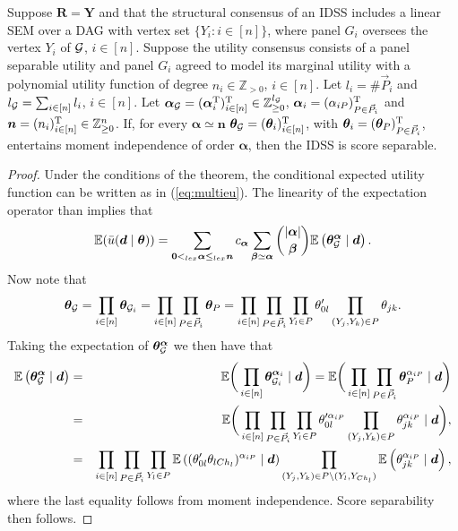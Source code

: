 \begin{theorem}
Suppose $\bm{R}=\bm{Y}$ and that the structural consensus of an IDSS includes a linear SEM over a DAG with vertex set $\{Y_i:i\in[n]\}$, where panel $G_i$ oversees the vertex $Y_i$ of $\mathcal{G}$, $i\in[n]$. Suppose the utility consensus consists of a panel separable  utility and panel $G_i$ agreed to model its marginal utility with a polynomial utility function of degree $n_i\in\mathbb{Z}_{>0}$, $i\in[n]$. Let $l_i=\#\vec{P}_i$ and $l_{\mathcal{G}}=\sum_{i\in[n]}l_i$, $i\in[n]$. Let $\bm{\alpha}_{\mathcal{G}}=(\bm{\alpha}_i^{\textnormal{T}})^{\textnormal{T}}_{i\in[n]}\in\mathbb{Z}^{l_{\mathcal{G}}}_{\geq 0}$, $\bm{\alpha}_i=(\alpha_{iP})^{\textnormal{T}}_{P\in\vec{P}_i}$ and $\bm{n}=(n_i)_{i\in[n]}^{\textnormal{T}}\in\mathbb{Z}^{n}_{\geq 0}$. If, for every $\bm{\alpha}\simeq \bm{n}$  $\bm{\theta}_{\mathcal{G}}=(\bm{\theta}_i)_{i\in[n]}^{\textnormal{T}}$, with $\bm{\theta}_i=(\bm{\theta}_{P})^{\textnormal{T}}_{P\in\vec{P}_i}$, entertains moment independence of order $\bm{\alpha}$, then the IDSS is score separable.  
\end{theorem}
 \begin{proof}
Under the conditions of the theorem, the conditional expected utility function can be written as in (\ref{eq:multieu}). The linearity of the expectation operator than implies that
\[
\mathbb{E}(\bar{u}(\bm{d}\;|\;\bm{\theta}))=\sum_{\bm{0}<_{lex}\bm{\alpha}\leq_{lex}\bm{n}}c_{\bm{\alpha}}\sum_{\bm{\beta}\simeq \bm{\alpha}}\binom{|\bm{\alpha}|}{\bm{\beta}}\mathbb{E}\left(\bm{\theta}_{\mathcal{G}}^{\bm{\alpha}}\;|\;\bm{d}\right).
\]
Now note that 
\[
\bm{\theta}_{\mathcal{G}}=\prod_{i\in[n]}\bm{\theta}_{\mathcal{G}_i}=\prod_{i\in[n]}\prod_{P\in\vec{P}_i}\bm{\theta}_P=\prod_{i\in[n]}\prod_{P\in\vec{P}_i}\prod_{Y_l\in P}\theta_{0l}'\prod_{(Y_j,Y_k)\in P}\theta_{jk}.
\]
Taking the expectation of $\bm{\theta}_{\mathcal{G}}^{\bm{\alpha}}$ we then have that 
\begin{eqnarray*}
\mathbb{E}\left(\bm{\theta}_{\mathcal{G}}^{\bm{\alpha}}\;|\;\bm{d}\right)&=& \mathbb{E}\bigg(\prod_{i\in[n]}\bm{\theta}_{\mathcal{G}_i}^{\bm{\alpha}_i}\;|\;\bm{d}\bigg)=\mathbb{E}\bigg(\prod_{i\in[n]}\prod_{P\in\vec{P}_i}\bm{\theta}_{P}^{\alpha_{iP}}\;|\;\bm{d}\bigg)\\
&=&\mathbb{E}\bigg(\prod_{i\in[n]}\prod_{P\in\vec{P}_i}\prod_{Y_l\in P}\theta_{0l}'^{\alpha_{iP}}\prod_{(Y_j,Y_k)\in P}\theta_{jk}^{\alpha_{iP}}\;|\;\bm{d}\bigg),\\
&=&\prod_{i\in[n]}\prod_{P\in\vec{P}_i}\prod_{Y_l\in P}\mathbb{E}\left((\theta_{0l}'\theta_{lCh_l})^{\alpha_{iP}}\;|\;\bm{d}\right)\prod_{(Y_j,Y_k)\in P \setminus (Y_l,Y_{Ch_l})}\mathbb{E}\left(\theta_{jk}^{\alpha_{iP}}\;|\;\bm{d}\right),
\end{eqnarray*}
where the last equality follows from moment independence. Score separability then follows.
 \end{proof}
 
